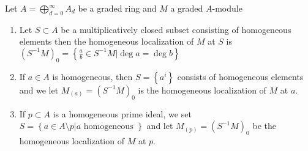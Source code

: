 \documentclass[../main.tex]{subfiles}
\begin{document}
\begin{defn}
	Let $A= \bigoplus_{d=0}^{ \infty }A_d$ be a graded ring and $M$  a graded $A$-module
	\begin{enumerate}
	\item Let $S \subset A$ be a multiplicatively closed subset consisting of homogeneous elements then the homogeneous localization of $M$ at $S$ is $( S^{-1}M)_0= \left\{ \frac{a}{b}\in S^{-1}M| \deg a= \deg b \right\} $ 
	\item If $a\in A$ is homogeneous, then $S= \left\{ a^{i} \right\} $ consists of homogeneous elements and we let $M_{( a) } = ( S^{-1}M)_0$ is the homogeneous localization of $M$ at $a$.
	\item If $p \subset A$ is a homogeneous prime ideal, we set $S= \left\{ a\in A\setminus p| a \text{ homogeneous }  \right\} $ and let $M_{( p) } = ( S^{-1}M)_0$ be the homogeneous localization of $M$ at $p$.
	\end{enumerate}
\end{defn}
\end{document}
